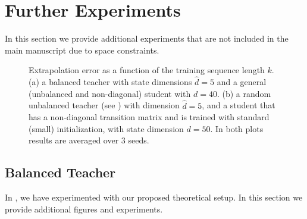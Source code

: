 \section{Further Experiments}\label{sec:apdx:additional_experiments}
In this section we provide additional experiments that are not included in the main manuscript due to space constraints.

\begin{figure}[H]
    \centering
    \caption{
    Extrapolation error as a function of the training sequence length $k$. (a) a balanced teacher with state dimensions $\hat{d}=5$ and a general (unbalanced and non-diagonal) student with $d=40$. (b) a random unbalanced teacher (see ) with dimension $\hat{d}=5$, and a student that has a non-diagonal transition matrix and is trained with standard (small) initialization, with state dimension $d=50$. In both plots results are averaged over 3 seeds.}
    \label{fig:apdx_additional_experiments}
\end{figure}

\subsection{Balanced Teacher}\label{sec:apdx:balanced_teacher}
In , we have experimented with our proposed theoretical setup. In this section we provide additional figures and experiments.


